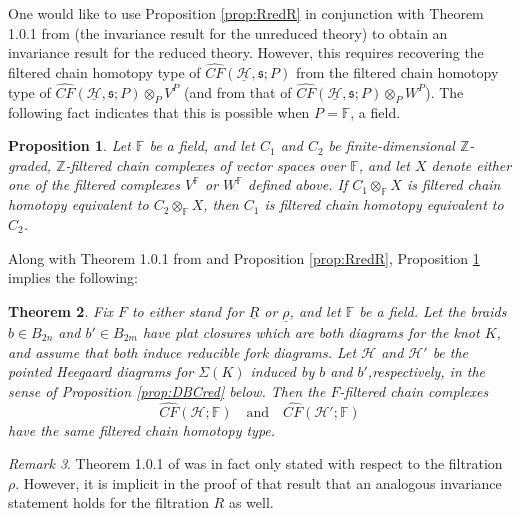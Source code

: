 \documentclass[11pt]{article}
\theoremstyle{plain} \newtheorem{thm}{Theorem}[subsection]
\theoremstyle{plain} \newtheorem{cor}[thm]{Corollary}
\theoremstyle{plain} \newtheorem{prop}[thm]{Proposition}
\theoremstyle{plain} \newtheorem{conj}[thm]{Conjecture}
\theoremstyle{plain} \newtheorem{lem}[thm]{Lemma}
\theoremstyle{definition} \newtheorem{df}[thm]{Definition}
\theoremstyle{remark} \newtheorem{rmk}[thm]{Remark}
\theoremstyle{remark} \newtheorem{obs}[thm]{Observation}
\newcommand{\DBC}[1]{\Sigma(#1)}
\newcommand{\h}{\mathcal{H}}
\newcommand{\red}[1]{\underline{#1}}
\newcommand{\CF}[1]{\widehat{CF}(\DBC{K})}
\numberwithin{equation}{section}
\begin{document}
One would like to use Proposition \ref{prop:RredR} in conjunction with Theorem 1.0.1 from \cite{et:R} (the invariance result for the unreduced theory) to obtain an invariance result for the reduced theory.  However, this requires recovering the filtered chain homotopy type of $\widehat{CF}(\red{\h}, \mathfrak{s}; P)$ from the filtered chain homotopy type of $\widehat{CF}(\red{\h}, \mathfrak{s}; P) \otimes_{P} V^P$ (and from that of $\widehat{CF}(\red{\h}, \mathfrak{s};P) \otimes_{P} W^P$).  The following fact indicates that this is possible when $P = \mathbb{F}$, a field.

\begin{prop}\label{prop:cancel}
Let $\mathbb{F}$ be a field, and let $C_1$ and $C_2$ be finite-dimensional $\mathbb{Z}$-graded, $\mathbb{Z}$-filtered chain complexes of vector spaces over $\mathbb{F}$, and let $X$ denote either one of the filtered complexes $V^{\mathbb{F}}$ or $W^{\mathbb{F}}$ defined above.  If $C_1 \otimes_{\mathbb{F}} X$ is filtered chain homotopy equivalent to $C_2 \otimes_{\mathbb{F}} X$, then $C_1$ is filtered chain homotopy equivalent to $C_2$.
\end{prop}

Along with Theorem 1.0.1 from \cite{et:R} and Proposition \ref{prop:RredR}, Proposition \ref{prop:cancel} implies the following:

\begin{thm}\label{thm:redRthm}
Fix $F$ to either stand for $\red{R}$ or $\red{\rho}$, and let $\mathbb{F}$ be a field.  Let the braids $b \in B_{2n}$ and $b' \in B_{2m}$ have plat closures which are both diagrams for the knot $K$, and assume that both induce reducible fork diagrams.  Let $\h$ and $\h'$ be the pointed Heegaard diagrams for $\DBC{K}$ induced by $b$ and $b'$,respectively, in the sense of Proposition \ref{prop:DBCred} below.  Then the $F$-filtered chain complexes
\begin{equation*}
\widehat{CF}(\h; \mathbb{F}) \quad \text{and} \quad \widehat{CF}(\h'; \mathbb{F})
\end{equation*}
have the same filtered chain homotopy type.
\end{thm}


\begin{rmk}\label{rmk:Rinv}
Theorem 1.0.1 of \cite{et:R} was in fact only stated with respect to the filtration $\rho$.  However, it is implicit in the proof of that result that an analogous invariance statement holds for the filtration $R$ as well.
\end{rmk}
\end{document}
